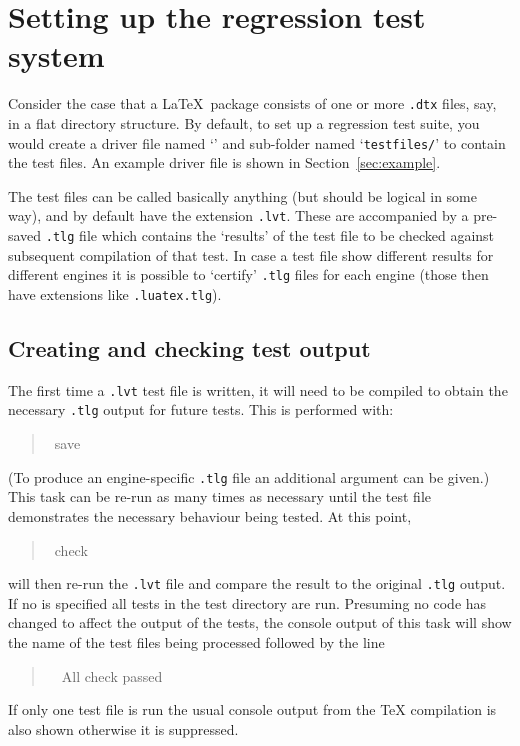\documentclass[a4paper]{ltugboat}
\begin{document}
\section{Setting up the regression test system}

Consider the case that a \LaTeX\ package consists of one or more
\texttt{.dtx} files, say, in a flat directory structure.  By default,
to set up a regression test suite, you would create a driver file
named `\texttt{\drivername}' and sub-folder named
`\texttt{testfiles/}' to contain the test files.  An example driver
file is shown in Section~\ref{sec:example}.

The test files can be called basically anything (but should be logical
in some way), and by default have the extension \texttt{.lvt}.  These are
accompanied by a pre-saved \texttt{.tlg} file which contains the
`results' of the test file to be checked against subsequent
compilation of that test. In case a test file show different results for different engines it is possible to `certify' \texttt{.tlg} files for each engine (those then have extensions like \texttt{.luatex.tlg}).


\subsection{Creating and checking test output}

The first time a \texttt{.lvt} test file is written, it will need to
be compiled to obtain the necessary \texttt{.tlg} output for future
tests.  This is performed with:
\begin{quote}\ttfamily
\execname~save~
\end{quote}
(To produce an engine-specific \texttt{.tlg} file an additional
 argument can be given.)  This task can be re-run as
many times as necessary until the test file demonstrates the necessary
behaviour being tested.
%
At this point, 
\begin{quote}\ttfamily
\execname~check~
\end{quote}
will then re-run the \texttt{.lvt} file and compare the result to the
original \texttt{.tlg} output.  
If no  is specified all tests in the test directory are run. Presuming no code has changed to
affect the output of the tests, the console output of this task will show the name of the test files being processed followed by the line
\begin{quote}\ttfamily
~~All check passed
\end{quote}
If only one test file is run the usual console output from the \TeX{} compilation is also shown otherwise it is suppressed.
\end{document}
